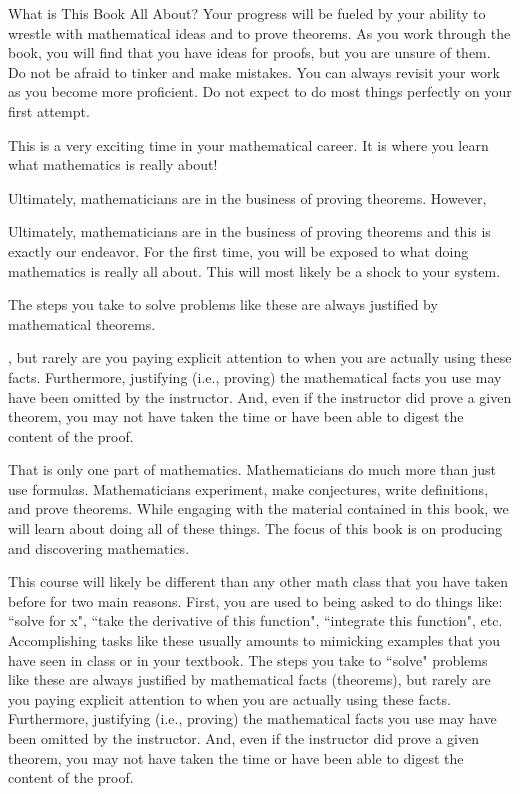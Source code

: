 \begin{section}{What is This Book All About?}
Your progress will be fueled by your ability to wrestle with mathematical ideas and to prove theorems.  As you work through the book, you will find that you have ideas for proofs, but you are unsure of them.  Do not be afraid to tinker and make mistakes.  You can always revisit your work as you become more proficient. Do not expect to do most things perfectly on your first attempt. 

This is a very exciting time in your mathematical career.  It is where you learn what mathematics is really about!

Ultimately, mathematicians are in the business of proving theorems. However,




Ultimately, mathematicians are in the business of proving theorems and this is exactly our endeavor. For the first time, you will be exposed to what doing mathematics is really all about. This will most likely be a shock to your system. 






The steps you take to solve problems like these are always justified by mathematical theorems.


, but rarely are you paying explicit attention to when you are actually using these facts. Furthermore, justifying (i.e., proving) the mathematical facts you use may have been omitted by the instructor. And, even if the instructor did prove a given theorem, you may not have taken the time or have been able to digest the content of the proof.

That is only one part of mathematics. Mathematicians do much more than just use formulas.  Mathematicians experiment, make conjectures, write definitions, and prove theorems.  While engaging with the material contained in this book, we will learn about doing all of these things. The focus of this book is on producing and discovering mathematics.  






This course will likely be different than any other math class that you have taken before for two main reasons. First, you are used to being asked to do things like: ``solve for x", ``take the derivative of this function", ``integrate this function", etc. Accomplishing tasks like these usually amounts to mimicking examples that you have seen in class or in your textbook. The steps you take to ``solve" problems like these are always justified by mathematical facts (theorems), but rarely are you paying explicit attention to when you are actually using these facts. Furthermore, justifying (i.e., proving) the mathematical facts you use may have been omitted by the instructor. And, even if the instructor did prove a given theorem, you may not have taken the time or have been able to digest the content of the proof.


\end{section}
